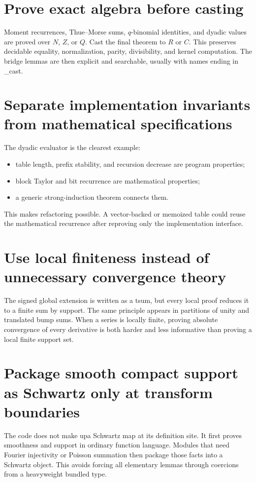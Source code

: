\documentclass[11pt,a4paper,openany]{book}
\def\code#1{#1}
\def\upfun{up}
\def\R{R}
\def\Q{Q}
\def\N{N}
\def\Z{Z}
\def\C{C}
\newcommand{\R}{\ensuremath{\mathbb{R}}}
\newcommand{\Q}{\ensuremath{\mathbb{Q}}}
\newcommand{\N}{\ensuremath{\mathbb{N}}}
\newcommand{\Z}{\ensuremath{\mathbb{Z}}}
\newcommand{\C}{\ensuremath{\mathbb{C}}}
\newcommand{\upfun}{\ensuremath{\operatorname{up}}}
\newcommand{\code}[1]{\texttt{\detokenize{#1}}}
\begin{document}
\section{Prove exact algebra before casting}
Moment recurrences, Thue--Morse sums, $q$-binomial identities, and dyadic values
are proved over $\N$, $\Z$, or $\Q$.  Cast the final theorem to $\R$ or $\C$.
This preserves decidable equality, normalization, parity, divisibility, and
kernel computation.  The bridge lemmas are then explicit and searchable,
usually with names ending in \code{_cast}.

\section{Separate implementation invariants from mathematical specifications}
The dyadic evaluator is the clearest example:
\begin{itemize}
  \item table length, prefix stability, and recursion decrease are program
        properties;
  \item block Taylor and bit recurrence are mathematical properties;
  \item a generic strong-induction theorem connects them.
\end{itemize}
This makes refactoring possible.  A vector-backed or memoized table could reuse
the mathematical recurrence after reproving only the implementation interface.

\section{Use local finiteness instead of unnecessary convergence theory}
The signed global extension is written as a \code{tsum}, but every local proof
reduces it to a finite sum by support.  The same principle appears in
partitions of unity and translated bump sums.  When a series is locally finite,
proving absolute convergence of every derivative is both harder and less
informative than proving a local finite support set.

\section{Package smooth compact support as Schwartz only at transform boundaries}
The code does not make \upfun a Schwartz map at its definition site.  It first
proves smoothness and support in ordinary function language.  Modules that need
Fourier injectivity or Poisson summation then package those facts into a
Schwartz object.  This avoids forcing all elementary lemmas through coercions
from a heavyweight bundled type.
\end{document}
